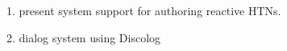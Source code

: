 \documentclass[conference]{IEEEtran}
\begin{document}
	1. present system support  for authoring reactive HTNs. 
	
	
	2. dialog system using Discolog
	
	
	
	
	
%	
%	
	

	
	
	\ifCLASSOPTIONcaptionsoff
	\newpage
	\fi
	
	
	
	
\end{document}

